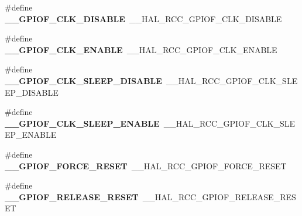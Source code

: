 \begin{DoxyCompactItemize}
\item 
\hypertarget{group___h_a_l___r_c_c___aliased_ga2ef7d457a77c095aa4b29d3bc8e7384c}{\#define {\bfseries \-\_\-\-\_\-\-G\-P\-I\-O\-F\-\_\-\-C\-L\-K\-\_\-\-D\-I\-S\-A\-B\-L\-E}~\-\_\-\-\_\-\-H\-A\-L\-\_\-\-R\-C\-C\-\_\-\-G\-P\-I\-O\-F\-\_\-\-C\-L\-K\-\_\-\-D\-I\-S\-A\-B\-L\-E}\label{group___h_a_l___r_c_c___aliased_ga2ef7d457a77c095aa4b29d3bc8e7384c}

\item 
\hypertarget{group___h_a_l___r_c_c___aliased_ga503234a173541674667d2898ed8dbca0}{\#define {\bfseries \-\_\-\-\_\-\-G\-P\-I\-O\-F\-\_\-\-C\-L\-K\-\_\-\-E\-N\-A\-B\-L\-E}~\-\_\-\-\_\-\-H\-A\-L\-\_\-\-R\-C\-C\-\_\-\-G\-P\-I\-O\-F\-\_\-\-C\-L\-K\-\_\-\-E\-N\-A\-B\-L\-E}\label{group___h_a_l___r_c_c___aliased_ga503234a173541674667d2898ed8dbca0}

\item 
\hypertarget{group___h_a_l___r_c_c___aliased_ga7f77f1d8c491f667cfe32ed10e274f94}{\#define {\bfseries \-\_\-\-\_\-\-G\-P\-I\-O\-F\-\_\-\-C\-L\-K\-\_\-\-S\-L\-E\-E\-P\-\_\-\-D\-I\-S\-A\-B\-L\-E}~\-\_\-\-\_\-\-H\-A\-L\-\_\-\-R\-C\-C\-\_\-\-G\-P\-I\-O\-F\-\_\-\-C\-L\-K\-\_\-\-S\-L\-E\-E\-P\-\_\-\-D\-I\-S\-A\-B\-L\-E}\label{group___h_a_l___r_c_c___aliased_ga7f77f1d8c491f667cfe32ed10e274f94}

\item 
\hypertarget{group___h_a_l___r_c_c___aliased_ga207010d823f26c276bb19983634b37ac}{\#define {\bfseries \-\_\-\-\_\-\-G\-P\-I\-O\-F\-\_\-\-C\-L\-K\-\_\-\-S\-L\-E\-E\-P\-\_\-\-E\-N\-A\-B\-L\-E}~\-\_\-\-\_\-\-H\-A\-L\-\_\-\-R\-C\-C\-\_\-\-G\-P\-I\-O\-F\-\_\-\-C\-L\-K\-\_\-\-S\-L\-E\-E\-P\-\_\-\-E\-N\-A\-B\-L\-E}\label{group___h_a_l___r_c_c___aliased_ga207010d823f26c276bb19983634b37ac}

\item 
\hypertarget{group___h_a_l___r_c_c___aliased_ga61155994f61ed0c2c6d3bc14aed0b9c4}{\#define {\bfseries \-\_\-\-\_\-\-G\-P\-I\-O\-F\-\_\-\-F\-O\-R\-C\-E\-\_\-\-R\-E\-S\-E\-T}~\-\_\-\-\_\-\-H\-A\-L\-\_\-\-R\-C\-C\-\_\-\-G\-P\-I\-O\-F\-\_\-\-F\-O\-R\-C\-E\-\_\-\-R\-E\-S\-E\-T}\label{group___h_a_l___r_c_c___aliased_ga61155994f61ed0c2c6d3bc14aed0b9c4}

\item 
\hypertarget{group___h_a_l___r_c_c___aliased_gad98def6c53d7028877c2f34e16de5b89}{\#define {\bfseries \-\_\-\-\_\-\-G\-P\-I\-O\-F\-\_\-\-R\-E\-L\-E\-A\-S\-E\-\_\-\-R\-E\-S\-E\-T}~\-\_\-\-\_\-\-H\-A\-L\-\_\-\-R\-C\-C\-\_\-\-G\-P\-I\-O\-F\-\_\-\-R\-E\-L\-E\-A\-S\-E\-\_\-\-R\-E\-S\-E\-T}\label{group___h_a_l___r_c_c___aliased_gad98def6c53d7028877c2f34e16de5b89}


\end{DoxyCompactItemize}
